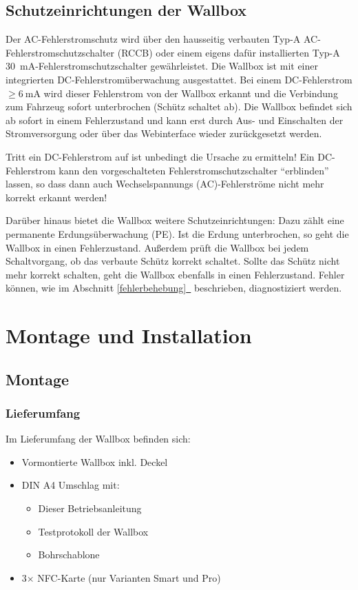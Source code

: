 \documentclass[a4paper,10pt]{article}
\newcommand{\hint}[1]{\begin{tcolorbox}[colback=boxgray,colframe=black,coltext=
white,title=Hinweis,left*=2mm,right*=2mm,boxsep=1mm,bottom=1mm,top=1mm]#1\end{tcolorbox}}
\newcommand*{\fullref}[1]{\hyperref[{#1}]{\ref*{#1}~\nameref*{#1}}}
\begin{document}
\begin{multicols*}{2}
	\subsection{Schutzeinrichtungen der Wallbox}\label{dcerrorhint}
	Der AC-Fehlerstromschutz wird über den hausseitig verbauten
	Typ-A AC-Fehlerstromschutzschalter (RCCB) oder einem eigens dafür installierten
	Typ-A \SI{30}{\milli\ampere}-Fehlerstromschutzschalter gewährleistet. Die Wallbox ist
	mit einer integrierten DC-Fehlerstromüberwachung ausgestattet.
	Bei einem DC-Fehlerstrom $\geq \SI{6}{\milli\ampere}$ wird dieser
	Fehlerstrom von der Wallbox erkannt und die Verbindung zum Fahrzeug sofort
	unterbrochen (Schütz schaltet ab). Die Wallbox befindet sich ab sofort in einem
	Fehlerzustand und kann erst durch Aus- und Einschalten der
	Stromversorgung oder über das Webinterface wieder zurückgesetzt werden.
	\hint{Tritt ein DC-Fehlerstrom auf ist unbedingt die Ursache zu
	ermitteln! Ein DC-Fehlerstrom kann den vorgeschalteten Fehlerstromschutzschalter
	\enquote{erblinden} lassen, so dass dann auch Wechselspannungs
	(AC)-Fehlerströme nicht mehr korrekt erkannt werden!}

	Darüber hinaus bietet die Wallbox weitere Schutzeinrichtungen: Dazu zählt eine
	permanente Erdungsüberwachung (PE). Ist die Erdung unterbrochen, so geht die
	Wallbox in einen Fehlerzustand. Außerdem prüft die Wallbox bei jedem
	Schaltvorgang, ob das verbaute Schütz korrekt schaltet. Sollte das
	Schütz nicht mehr korrekt schalten, geht die Wallbox ebenfalls in einen Fehlerzustand.
	Fehler können, wie im Abschnitt \fullref{fehlerbehebung} beschrieben, diagnostiziert werden.

	\newpage
	\section{Montage und Installation}
	\subsection{Montage}
	\subsubsection{Lieferumfang}
	Im Lieferumfang der Wallbox befinden sich:
	\begin{itemize}
		\item Vormontierte Wallbox inkl. Deckel
		\item DIN A4 Umschlag mit:
		\begin{itemize}
			\item Dieser Betriebsanleitung
			\item Testprotokoll der Wallbox
			\item Bohrschablone
		\end{itemize}
		\item 3$\times$ NFC-Karte (nur Varianten Smart und Pro)
	\end{itemize}


\end{multicols*}
\end{document}
